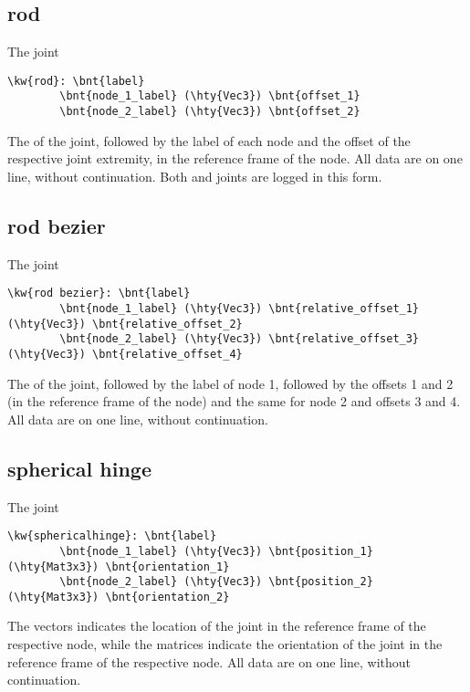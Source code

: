 \subsection{rod}
The  joint
\begin{Verbatim}[commandchars=\\\{\}]
    \kw{rod}: \bnt{label}
        \bnt{node_1_label} (\hty{Vec3}) \bnt{offset_1}
        \bnt{node_2_label} (\hty{Vec3}) \bnt{offset_2}
\end{Verbatim}
The  of the joint, followed by the label of each node
and the offset of the respective joint extremity,
in the reference frame of the node.
All data are on one line, without continuation.
Both  and  joints are logged
in this form.

\subsection{rod bezier}
The  joint
\begin{Verbatim}[commandchars=\\\{\}]
	\kw{rod bezier}: \bnt{label}
		\bnt{node_1_label} (\hty{Vec3}) \bnt{relative_offset_1} (\hty{Vec3}) \bnt{relative_offset_2}
		\bnt{node_2_label} (\hty{Vec3}) \bnt{relative_offset_3} (\hty{Vec3}) \bnt{relative_offset_4}
\end{Verbatim}
The  of the joint, followed by the label of node 1, 
followed by the offsets 1 and 2 (in the reference frame of the
node) and the same for node 2 and offsets 3 and 4.
All data are on one line, without continuation.

\subsection{spherical hinge}
The  joint
\begin{Verbatim}[commandchars=\\\{\}]
    \kw{sphericalhinge}: \bnt{label}
        \bnt{node_1_label} (\hty{Vec3}) \bnt{position_1} (\hty{Mat3x3}) \bnt{orientation_1}
        \bnt{node_2_label} (\hty{Vec3}) \bnt{position_2} (\hty{Mat3x3}) \bnt{orientation_2}
\end{Verbatim}
The  vectors indicates the location of the joint
in the reference frame of the respective node,
while the  matrices indicate the orientation of the joint
in the reference frame of the respective node.
All data are on one line, without continuation.

